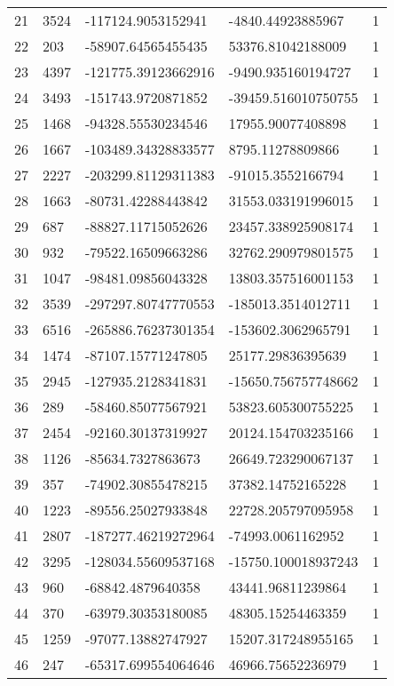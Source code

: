 \begin{longtable}{lllll}
    21 & 3524 & -117124.9053152941 & -4840.44923885967 & 1 \\
    22 & 203 & -58907.64565455435 & 53376.81042188009 & 1 \\
    23 & 4397 & -121775.39123662916 & -9490.935160194727 & 1 \\
    24 & 3493 & -151743.9720871852 & -39459.516010750755 & 1 \\
    25 & 1468 & -94328.55530234546 & 17955.90077408898 & 1 \\
    26 & 1667 & -103489.34328833577 & 8795.11278809866 & 1 \\
    27 & 2227 & -203299.81129311383 & -91015.3552166794 & 1 \\
    28 & 1663 & -80731.42288443842 & 31553.033191996015 & 1 \\
    29 & 687 & -88827.11715052626 & 23457.338925908174 & 1 \\
    30 & 932 & -79522.16509663286 & 32762.290979801575 & 1 \\
    31 & 1047 & -98481.09856043328 & 13803.357516001153 & 1 \\
    32 & 3539 & -297297.80747770553 & -185013.3514012711 & 1 \\
    33 & 6516 & -265886.76237301354 & -153602.3062965791 & 1 \\
    34 & 1474 & -87107.15771247805 & 25177.29836395639 & 1 \\
    35 & 2945 & -127935.2128341831 & -15650.756757748662 & 1 \\
    36 & 289 & -58460.85077567921 & 53823.605300755225 & 1 \\
    37 & 2454 & -92160.30137319927 & 20124.154703235166 & 1 \\
    38 & 1126 & -85634.7327863673 & 26649.723290067137 & 1 \\
    39 & 357 & -74902.30855478215 & 37382.14752165228 & 1 \\
    40 & 1223 & -89556.25027933848 & 22728.205797095958 & 1 \\
    41 & 2807 & -187277.46219272964 & -74993.0061162952 & 1 \\
    42 & 3295 & -128034.55609537168 & -15750.100018937243 & 1 \\
    43 & 960 & -68842.4879640358 & 43441.96811239864 & 1 \\
    44 & 370 & -63979.30353180085 & 48305.15254463359 & 1 \\
    45 & 1259 & -97077.13882747927 & 15207.317248955165 & 1 \\
    46 & 247 & -65317.699554064646 & 46966.75652236979 & 1 \\

\end{longtable}
